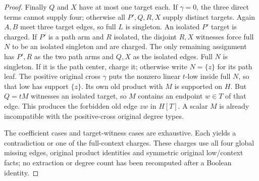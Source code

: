 \documentclass[11pt]{article}
\theoremstyle{definition}
\theoremstyle{remark}
\begin{document}
\begin{proof}
Finally $Q$ and $X$ have at most one target each. If $\gamma=0$, the three direct terms cannot supply four; otherwise all $P',Q,R,X$ supply distinct targets. Again $A,B$ meet three target edges, so full $L$ is singleton. An isolated $P'$ target is charged. If $P'$ is a path arm and $R$ isolated, the disjoint $R,X$ witnesses force full $N$ to be an isolated singleton and are charged. The only remaining assignment has $P',R$ as the two path arms and $Q,X$ as the isolated edges. Full $N$ is singleton. If it is the path center, charge it; otherwise write $N=\{z\}$ for its path leaf. The positive original cross $\gamma$ puts the nonzero linear $t$-low inside full $N$, so that low has support $\{z\}$. Its own old product with $M$ is supported on $H$. But $Q=tM$ witnesses an isolated target, so $M$ contains an endpoint $w\in T$ of that edge. This produces the forbidden old edge $zw$ in $H[T]$. A scalar $M$ is already incompatible with the positive-cross original degree types.

The coefficient cases and target-witness cases are exhaustive. Each yields a contradiction or one of the full-context charges. These charges use all four global missing edges, original product identities and symmetric original low/context facts; no extraction or degree count has been recomputed after a Boolean identity.
\end{proof}
\end{document}
